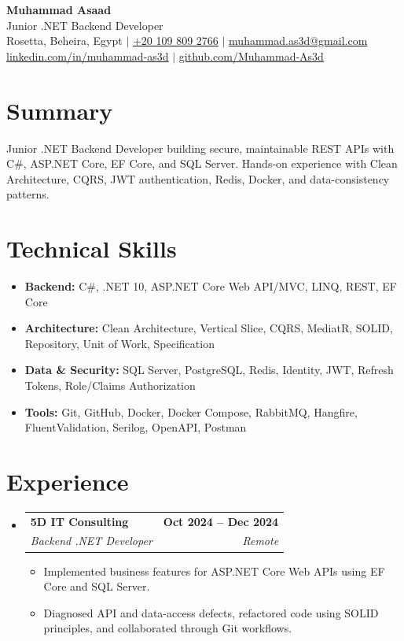 \documentclass[a4paper,10pt]{article}
\newcommand{\resumeItem}[1]{\item\small{#1}}
\newcommand{\resumeSubheading}[4]{
  \vspace{-2pt}\item
  \begin{tabularx}{0.98\textwidth}[t]{
    >{\raggedright\arraybackslash}X
    >{\raggedleft\arraybackslash}r
  }
    \textbf{#1} & \textbf{\small #2} \\
    \textit{\small #3} & \textit{\small #4}
  \end{tabularx}
  \vspace{-8pt}
}
\newcommand{\resumeSubHeadingListStart}{
  \begin{itemize}[leftmargin=0.12in,label={},itemsep=0pt,topsep=1pt]
}
\newcommand{\resumeSubHeadingListEnd}{\end{itemize}\vspace{-3pt}}
\newcommand{\resumeItemListStart}{
  \begin{itemize}[leftmargin=0.20in,label=\textbullet,itemsep=0pt,topsep=2pt,parsep=0pt]
}
\newcommand{\resumeItemListEnd}{\end{itemize}\vspace{-5pt}}
\begin{document}
\begin{center}
  {\LARGE\textbf{Muhammad Asaad}} \\[-1pt]
  {\normalsize Junior .NET Backend Developer} \\[3pt]
  \small
  Rosetta, Beheira, Egypt $|$
  \href{tel:+201098092766}{+20 109 809 2766} $|$
  \href{mailto:muhammad.as3d@gmail.com}{muhammad.as3d@gmail.com} \\[-1pt]
  \href{https://linkedin.com/in/muhammad-as3d}{linkedin.com/in/muhammad-as3d} $|$
  \href{https://github.com/Muhammad-As3d}{github.com/Muhammad-As3d}
\end{center}
\vspace{-8pt}

\section{Summary}
\small{Junior .NET Backend Developer building secure, maintainable REST APIs with C\#,
ASP.NET Core, EF Core, and SQL Server. Hands-on experience with Clean Architecture,
CQRS, JWT authentication, Redis, Docker, and data-consistency patterns.}

\section{Technical Skills}
\resumeSubHeadingListStart
  \resumeItem{\textbf{Backend:} C\#, .NET 10, ASP.NET Core Web API/MVC, LINQ, REST, EF Core}
  \resumeItem{\textbf{Architecture:} Clean Architecture, Vertical Slice, CQRS, MediatR, SOLID, Repository, Unit of Work, Specification}
  \resumeItem{\textbf{Data \& Security:} SQL Server, PostgreSQL, Redis, Identity, JWT, Refresh Tokens, Role/Claims Authorization}
  \resumeItem{\textbf{Tools:} Git, GitHub, Docker, Docker Compose, RabbitMQ, Hangfire, FluentValidation, Serilog, OpenAPI, Postman}
\resumeSubHeadingListEnd

\section{Experience}
\resumeSubHeadingListStart
  \resumeSubheading
    {5D IT Consulting}{Oct 2024 -- Dec 2024}
    {Backend .NET Developer}{Remote}
  \resumeItemListStart
    \resumeItem{Implemented business features for ASP.NET Core Web APIs using EF Core and SQL Server.}
    \resumeItem{Diagnosed API and data-access defects, refactored code using SOLID principles, and collaborated through Git workflows.}
  \resumeItemListEnd
\resumeSubHeadingListEnd
\end{document}
